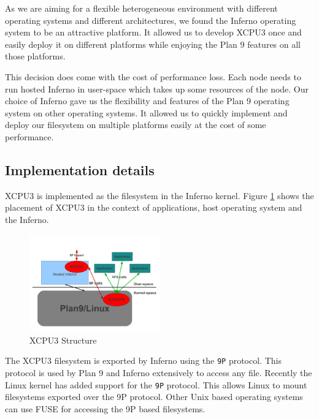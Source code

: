 \documentclass{sig-alternate}
\begin{document}
As we are aiming for a flexible heterogeneous environment with different
operating systems and different architectures, we found the Inferno operating
system to be an attractive platform.  It allowed us to develop XCPU3 once and
easily deploy it on different platforms while enjoying the Plan 9 features
on all those platforms.

This decision does come with the cost of performance loss.  Each node needs
to run hosted Inferno in user-space which takes up some resources of the node. 
Our choice of Inferno gave us the flexibility and features of the Plan 9
operating system on other operating systems.  It allowed us to quickly
implement and deploy our filesystem on multiple platforms easily at the cost
of some performance.

\subsection{Implementation details}

XCPU3 is implemented as the filesystem in the Inferno kernel.  Figure 
\ref{fig:XCPU3} shows the placement of XCPU3 in the context of applications,
host operating system and the Inferno.

\begin{figure}[h]
  \begin{center}
    \leavevmode
      \includegraphics[height=0.2\textheight,width=0.5\textwidth]
		{./img/XCPU3Structure}
    \caption{XCPU3 Structure}
    \label{fig:XCPU3}
  \end{center}
\end{figure}

The XCPU3 filesystem is exported by Inferno using the \texttt{9P} protocol. 
This protocol is used by Plan 9 and Inferno extensively to access any file. 
Recently the Linux kernel has added support for the \texttt{9P}
protocol\cite{graverobbers}.  This allows Linux to mount filesystems
exported over the 9P protocol.  Other Unix based operating systems can use
FUSE\cite{FUSE} for accessing the 9P based filesystems. 
\end{document}
